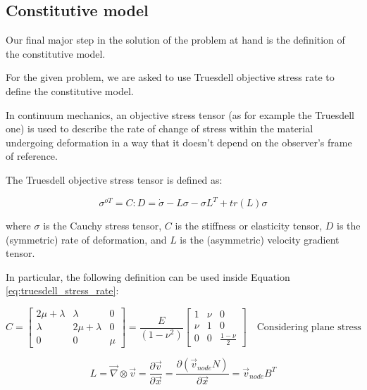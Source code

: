 \subsection{Constitutive model}
\label{subsec:constitutive_model}

Our final major step in the solution of the problem at hand is the definition of the constitutive model.

For the given problem, we are asked to use Truesdell objective stress rate to define the constitutive model.

In continuum mechanics, an objective stress tensor (as for example the Truesdell one) is used to describe the rate of change of stress within the material undergoing deformation in a way that it doesn't depend on the observer's frame of reference.

The Truesdell objective stress tensor is defined as:

\begin{equation}
    {\sigma}^{oT} = C : D = \dot{\sigma} - L \sigma - \sigma L^T + tr(L) \sigma
    \label{eq:truesdell_stress_rate}
\end{equation}

where $\sigma$ is the Cauchy stress tensor, $C$ is the stiffness or elasticity tensor, $D$ is the (symmetric) rate of deformation, and $L$ is the (asymmetric) velocity gradient tensor.

In particular, the following definition can be used inside Equation \ref{eq:truesdell_stress_rate}:

\begin{equation}
    C = \begin{bmatrix}
        2\mu + \lambda & \lambda        & 0   \\
        \lambda        & 2\mu + \lambda & 0   \\
        0              & 0              & \mu
    \end{bmatrix} = \frac{E}{(1 - \nu^2)} \begin{bmatrix}
        1   & \nu & 0                 \\
        \nu & 1   & 0                 \\
        0   & 0   & \frac{1 - \nu}{2}
    \end{bmatrix} \quad \text{Considering plane stress}
    \label{eq:stiffness_tensor}
\end{equation}

\begin{equation}
    L = \vec{\nabla} \otimes \vec{v} = \frac{\partial \vec{v}}{\partial \vec{x}} = \frac{\partial (\vec{v}_{node} N)}{\partial \vec{x}} = \vec{v}_{node} B^T
    \label{eq:velocity_gradient_tensor}
\end{equation}

